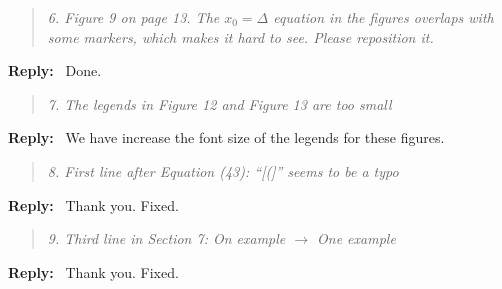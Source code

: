\documentclass[11pt]{article}
\newenvironment{response}{%
  \vspace{1em}
  \begin{quote}\itshape
}{%
  \end{quote}
  \noindent\textbf{Reply:}~
}
\begin{document}
\begin{response}{6.}
    Figure 9 on page 13. The $x_0 = \Delta$ equation in the figures overlaps with some markers, which makes it hard to see. Please reposition it.
\end{response}
Done.



\begin{response}{7.}
    The legends in Figure 12 and Figure 13 are too small
\end{response}
We have increase the font size of the legends for these figures. 


\begin{response}{8.}
    First line after Equation (43): “[(]” seems to be a typo
\end{response}
Thank you. Fixed.


\begin{response}{9.}
    Third line in Section 7: On example $\rightarrow$ One example
\end{response}
Thank you. Fixed.
\end{document}
